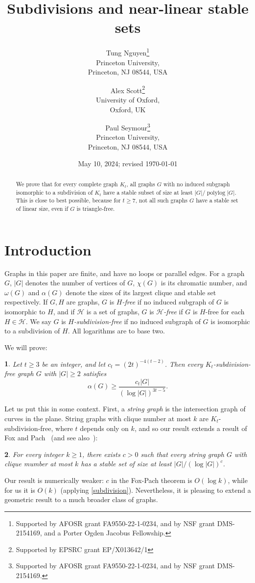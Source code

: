 \documentclass[titlepage,11pt]{article}
\title{Subdivisions and near-linear stable sets}
\author{
Tung Nguyen\thanks{Supported by AFOSR grant
FA9550-22-1-0234, and by NSF grant  DMS-2154169, and a Porter Ogden Jacobus Fellowship.}\\
Princeton University,\\ Princeton, NJ 08544, USA
\and
Alex Scott\thanks{Supported by EPSRC grant EP/X013642/1}\\
University of Oxford, \\
Oxford, UK
\and
Paul Seymour\thanks{Supported by AFOSR grant
FA9550-22-1-0234, and by NSF grant  DMS-2154169.}\\
Princeton University,\\ Princeton, NJ 08544, USA}
\date{May 10, 2024; revised \today}
\newtheorem{thm}{}[section]
\begin{document}
\maketitle
\begin{abstract}
We prove that for every complete graph $K_t$, all graphs $G$ with no induced subgraph isomorphic to a subdivision of $K_t$ have a stable subset of 
size at least
$|G|/\operatorname{polylog}|G|$. This is close to best possible, because for $t\ge 7$, not all such graphs
$G$ have a stable set of linear size, even if $G$ is triangle-free.

\end{abstract}

\section{Introduction}

Graphs in this paper are finite, and have no loops or parallel edges. For a graph $G$, $|G|$ denotes the number of vertices of $G$,
$\chi(G)$ is its chromatic number, and $\omega(G)$ and $\alpha(G)$ denote the sizes of its largest clique and stable set 
respectively. If $G,H$ are graphs, $G$ is {\em $H$-free} if no induced subgraph of $G$ is isomorphic to $H$, and if $\mathcal{H}$
is a set of graphs, $G$ is {\em $\mathcal{H}$-free} if $G$ is $H$-free for each $H\in \mathcal{H}$. 
We say $G$ is {\em $H$-subdivision-free} if no induced subgraph of $G$ is isomorphic to a subdivision of $H$. All logarithms are 
to base two.

We will prove:
\begin{thm} \label{stable2}
Let $t\ge 3$ be an integer, and let $c_t= (2t)^{-4(t-2)}$. Then 
every $K_t$-subdivision-free graph $G$ with $|G|\ge 2$ satisfies
$$\alpha(G)\ge \frac{c_t|G|}{(\log |G|)^{3t-5}}.$$
\end{thm}
Let us put this in some context. 
First, a {\em string graph} is the intersection graph of curves in the plane. String graphs with clique number at most $k$ are 
$K_t$-subdivision-free, where $t$ depends only on $k$, and so our result extends a result of Fox and Pach~\cite{fox} (and see also~\cite{fox2}):
\begin{thm}\label{string}
For every integer $k\ge 1$, there exists $c>0$ such that every string graph $G$ with clique mumber at most $k$
has a stable set of size at least
$|G|/(\log |G|)^c$.
\end{thm}
Our result is numerically weaker: $c$ in the Fox-Pach theorem is $O(\log k)$, while for us it is $O(k)$ (applying \ref{subdivision}). 
Nevertheless, it is 
pleasing to extend a geometric result to a much broader class of graphs.
\end{document}
